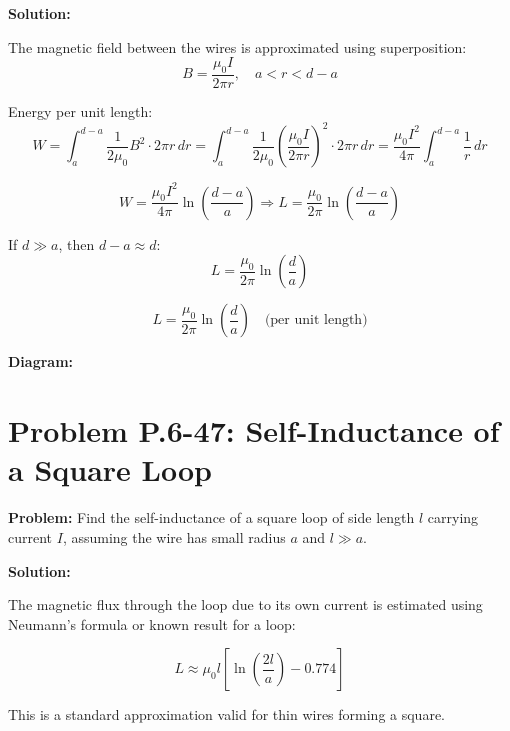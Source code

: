 \documentclass[12pt]{article}
\begin{document}
\textbf{Solution:}

The magnetic field between the wires is approximated using superposition:
\[
B = \frac{\mu_0 I}{2\pi r}, \quad a < r < d-a
\]

Energy per unit length:
\[
W = \int_a^{d-a} \frac{1}{2\mu_0} B^2 \cdot 2\pi r \, dr
= \int_a^{d-a} \frac{1}{2\mu_0} \left( \frac{\mu_0 I}{2\pi r} \right)^2 \cdot 2\pi r \, dr
= \frac{\mu_0 I^2}{4\pi} \int_a^{d-a} \frac{1}{r} \, dr
\]

\[
W = \frac{\mu_0 I^2}{4\pi} \ln\left( \frac{d-a}{a} \right)
\Rightarrow L = \frac{\mu_0}{2\pi} \ln\left( \frac{d-a}{a} \right)
\]

If \( d \gg a \), then \( d-a \approx d \):
\[
\boxed{L = \frac{\mu_0}{2\pi} \ln\left( \frac{d}{a} \right)}
\]

\begin{tcolorbox}
\[
\boxed{L = \frac{\mu_0}{2\pi} \ln\left( \frac{d}{a} \right)} \quad \text{(per unit length)}
\]
\end{tcolorbox}

\textbf{Diagram:}
\begin{center}
\end{center}



\section*{Problem P.6-47: Self-Inductance of a Square Loop}

\textbf{Problem:}  
Find the self-inductance of a square loop of side length \( l \) carrying current \( I \), assuming the wire has small radius \( a \) and \( l \gg a \).

\textbf{Solution:}

The magnetic flux through the loop due to its own current is estimated using Neumann’s formula or known result for a loop:

\[
L \approx \mu_0 l \left[ \ln\left( \frac{2l}{a} \right) - 0.774 \right]
\]

This is a standard approximation valid for thin wires forming a square.
\end{document}
